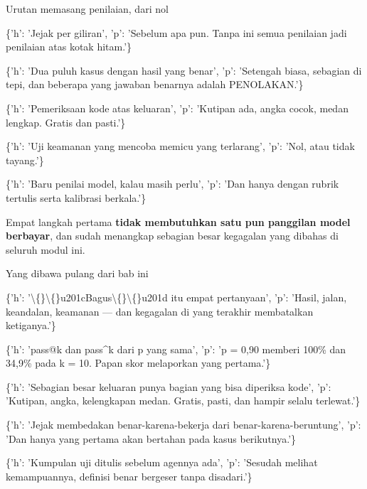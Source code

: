 \documentclass[aspectratio=169,11pt,t]{beamer}
\begin{document}
\begin{frame}[shrink=25]{Urutan memasang penilaian, dari nol}
\begin{isteps}
\item \{'h': 'Jejak per giliran', 'p': 'Sebelum apa pun. Tanpa ini semua penilaian jadi penilaian atas kotak hitam.'\}
\item \{'h': 'Dua puluh kasus dengan hasil yang benar', 'p': 'Setengah biasa, sebagian di tepi, dan beberapa yang jawaban benarnya adalah PENOLAKAN.'\}
\item \{'h': 'Pemeriksaan kode atas keluaran', 'p': 'Kutipan ada, angka cocok, medan lengkap. Gratis dan pasti.'\}
\item \{'h': 'Uji keamanan yang mencoba memicu yang terlarang', 'p': 'Nol, atau tidak tayang.'\}
\item \{'h': 'Baru penilai model, kalau masih perlu', 'p': 'Dan hanya dengan rubrik tertulis serta kalibrasi berkala.'\}
\end{isteps}
\begin{iband}[signal]
Empat langkah pertama \textbf{tidak membutuhkan satu pun panggilan model berbayar}, dan sudah menangkap sebagian besar kegagalan yang dibahas di seluruh modul ini.
\end{iband}
\end{frame}

\begin{frame}[shrink=25]{Yang dibawa pulang dari bab ini}
\begin{isteps}
\item \{'h': '\textbackslash\{\}\textbackslash\{\}u201cBagus\textbackslash\{\}\textbackslash\{\}u201d itu empat pertanyaan', 'p': 'Hasil, jalan, keandalan, keamanan --- dan kegagalan di yang terakhir membatalkan ketiganya.'\}
\item \{'h': 'pass@k dan pass\textasciicircum{}k dari p yang sama', 'p': 'p = 0,90 memberi 100\% dan 34,9\% pada k = 10. Papan skor melaporkan yang pertama.'\}
\item \{'h': 'Sebagian besar keluaran punya bagian yang bisa diperiksa kode', 'p': 'Kutipan, angka, kelengkapan medan. Gratis, pasti, dan hampir selalu terlewat.'\}
\item \{'h': 'Jejak membedakan benar-karena-bekerja dari benar-karena-beruntung', 'p': 'Dan hanya yang pertama akan bertahan pada kasus berikutnya.'\}
\item \{'h': 'Kumpulan uji ditulis sebelum agennya ada', 'p': 'Sesudah melihat kemampuannya, definisi benar bergeser tanpa disadari.'\}
\end{isteps}
\end{frame}
\end{document}
